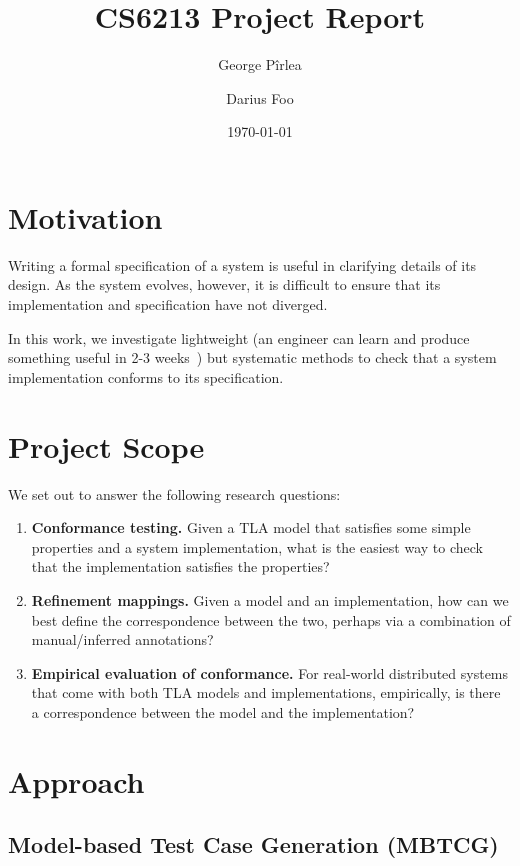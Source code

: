 \documentclass[a4paper]{article}
\title{CS6213 Project Report}
\author{George Pîrlea \and Darius Foo}
\date{\today}
\begin{document}
\maketitle

\section{Motivation}

Writing a formal specification of a system is useful in clarifying details of its design.
%
As the system evolves, however, it is difficult to ensure that its implementation and specification have not diverged.

In this work, we investigate lightweight (an engineer can learn and produce something useful in 2-3 weeks~\cite{newcombe_how_2015}) but systematic methods to check that a system implementation conforms to its specification.

\section{Project Scope}

We set out to answer the following research questions:

\begin{enumerate}[label={(Q\arabic*)}]
    \item \textbf{Conformance testing.} Given a TLA model that satisfies some simple properties and a system implementation, what is the easiest way to check that the implementation satisfies the properties?

    \item \textbf{Refinement mappings.} Given a model and an implementation, how can we best define the correspondence between the two, perhaps via a combination of manual/inferred annotations?

    \item \textbf{Empirical evaluation of conformance.} For real-world distributed systems that come with both TLA models and implementations, empirically, is there a correspondence between the model and the implementation?
\end{enumerate}

\section{Approach}

\subsection{Model-based Test Case Generation (MBTCG)}
\end{document}
